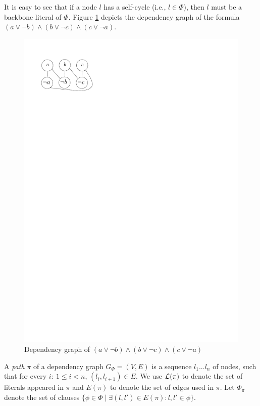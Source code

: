 It is easy to see that if a node $l$ has a self-cycle (i.e., $l\in\Phi$), then $l$ must be a backbone literal of $\Phi$.
Figure \ref{fig:depend} depicts the dependency graph of the formula $(a\vee\neg b)\wedge(b\vee\neg c)\wedge(c\vee\neg a)$.
 \begin{figure}
    \centering
    \includegraphics[scale=0.7]{dependency.pdf}
   \caption{Dependency graph of $(a\vee\neg b)\wedge(b\vee\neg c)\wedge(c\vee\neg a)$}
   \label{fig:depend}
\end{figure}

A \emph{path} $\pi$ of a dependency graph  $G_\Phi=(V,E)$ is a sequence $l_1...l_n$ of nodes, such that for every $i:\ 1\leq i<n$, $(l_i,l_{i+1})\in E$.
We use ${\cal L}(\pi)$ to denote the set of literals appeared in $\pi$ and $E(\pi)$ to denote the set of edges used in $\pi$.
Let $\Phi_\pi$ denote the set of clauses $\{\phi\in\Phi\mid \exists (l,l')\in E(\pi): l,l'\in \phi\}$.

